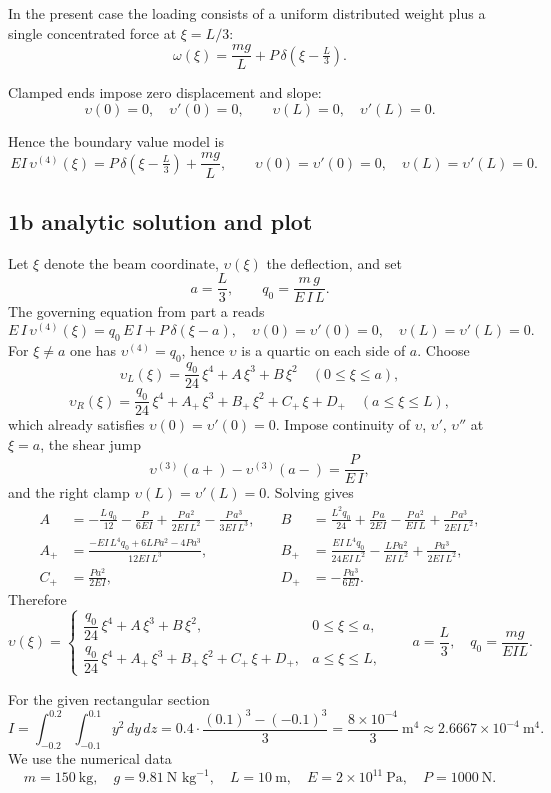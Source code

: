 \documentclass[12pt, a4paper]{article}
\begin{document}
In the present case the loading consists of a uniform distributed weight plus a single concentrated force at $\xi=L/3$:
\[
\omega(\xi) = \frac{m g}{L}+P\,\delta\!\left(\xi-\tfrac{L}{3}\right).
\]

Clamped ends impose zero displacement and slope:
\[
\upsilon(0)=0,\quad \upsilon'(0)=0,\qquad 
\upsilon(L)=0,\quad \upsilon'(L)=0.
\]

Hence the boundary value model is
\[
\boxed{\,E I\,\upsilon^{(4)}(\xi)=P\,\delta\!\left(\xi-\tfrac{L}{3}\right)+\frac{m g}{L},\qquad
\upsilon(0)=\upsilon'(0)=0,\quad \upsilon(L)=\upsilon'(L)=0.\,}
\]


\subsection*{1b \quad analytic solution and plot}

Let $\xi$ denote the beam coordinate, $\upsilon(\xi)$ the deflection, and set
\[
a=\frac{L}{3},
\qquad
q_{0}=\frac{m\,g}{E\,I\,L}.
\]
The governing equation from part a reads
\[
E\,I\,\upsilon^{(4)}(\xi)=q_{0}\,E\,I+P\,\delta(\xi-a),
\quad
\upsilon(0)=\upsilon'(0)=0,\quad \upsilon(L)=\upsilon'(L)=0.
\]
For $\xi\neq a$ one has $\upsilon^{(4)}=q_{0}$, hence $\upsilon$ is a quartic on each side of $a$.
Choose
\[
\upsilon_{L}(\xi)=\frac{q_{0}}{24}\,\xi^{4}+A\,\xi^{3}+B\,\xi^{2}\quad (0\le \xi\le a),
\]
\[
\upsilon_{R}(\xi)=\frac{q_{0}}{24}\,\xi^{4}+A_{+}\,\xi^{3}+B_{+}\,\xi^{2}+C_{+}\,\xi+D_{+}\quad (a\le \xi\le L),
\]
which already satisfies $\upsilon(0)=\upsilon'(0)=0$.
Impose continuity of $\upsilon$, $\upsilon'$, $\upsilon''$ at $\xi=a$, the shear jump
\[
\upsilon^{(3)}(a+)-\upsilon^{(3)}(a-)=\frac{P}{E\,I},
\]
and the right clamp $\upsilon(L)=\upsilon'(L)=0$. Solving gives
\[
\begin{aligned}
A&=-\frac{L\,q_{0}}{12}-\frac{P}{6E I}+\frac{P\,a^{2}}{2E I\,L^{2}}-\frac{P\,a^{3}}{3E I\,L^{3}},&
\quad
B&=\frac{L^{2}q_{0}}{24}+\frac{P\,a}{2E I}-\frac{P\,a^{2}}{E I\,L}+\frac{P\,a^{3}}{2E I\,L^{2}},\\[2mm]
A_{+}&=\frac{-E I\,L^{4}q_{0}+6L P a^{2}-4 P a^{3}}{12E I\,L^{3}},&
\quad
B_{+}&=\frac{E I\,L^{4}q_{0}}{24E I\,L^{2}}-\frac{L P a^{2}}{E I\,L^{2}}+\frac{P a^{3}}{2E I\,L^{2}},\\[2mm]
C_{+}&=\frac{P a^{2}}{2E I},&
\quad
D_{+}&=-\frac{P a^{3}}{6E I}.
\end{aligned}
\]
Therefore
\[
\boxed{
\upsilon(\xi)=
\begin{cases}
\dfrac{q_{0}}{24}\,\xi^{4}+A\,\xi^{3}+B\,\xi^{2}, & 0\le \xi\le a,\\[6pt]
\dfrac{q_{0}}{24}\,\xi^{4}+A_{+}\,\xi^{3}+B_{+}\,\xi^{2}+C_{+}\,\xi+D_{+}, & a\le \xi\le L,
\end{cases}}
\qquad a=\dfrac{L}{3},\quad q_{0}=\dfrac{m g}{E I L}.
\]

For the given rectangular section
\[
I=\int_{-0.2}^{0.2}\!\int_{-0.1}^{0.1} y^{2}\,dy\,dz
=0.4\cdot\frac{(0.1)^{3}-(-0.1)^{3}}{3}
=\frac{8\times 10^{-4}}{3}\ \text{m}^{4}\approx 2.6667\times 10^{-4}\ \text{m}^{4}.
\]
We use the numerical data
\[
m=150~\text{kg},\quad g=9.81~\text{N kg}^{-1},\quad L=10~\text{m},\quad
E=2\times 10^{11}~\text{Pa},\quad P=1000~\text{N}.
\]



\printbibliography
\end{document}
